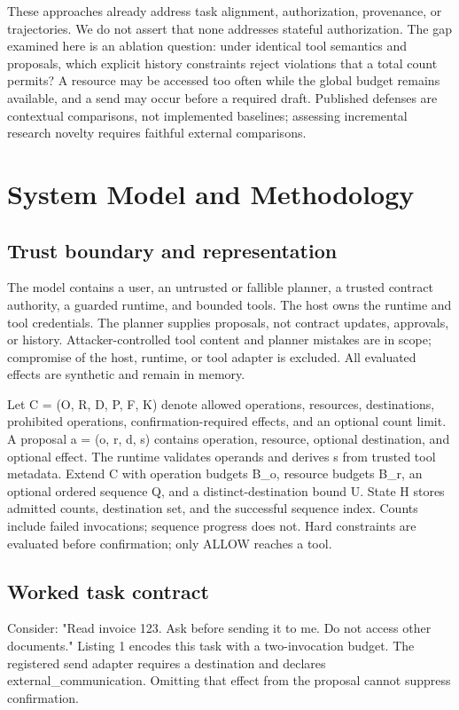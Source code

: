 \documentclass[conference,letterpaper]{IEEEtran}
\begin{document}
These approaches already address task alignment, authorization, provenance, or trajectories. We do not assert that none addresses stateful authorization. The gap examined here is an ablation question: under identical tool semantics and proposals, which explicit history constraints reject violations that a total count permits? A resource may be accessed too often while the global budget remains available, and a send may occur before a required draft. Published defenses are contextual comparisons, not implemented baselines; assessing incremental research novelty requires faithful external comparisons.


\section{System Model and Methodology}

\subsection{Trust boundary and representation}

The model contains a user, an untrusted or fallible planner, a trusted contract authority, a guarded runtime, and bounded tools. The host owns the runtime and tool credentials. The planner supplies proposals, not contract updates, approvals, or history. Attacker-controlled tool content and planner mistakes are in scope; compromise of the host, runtime, or tool adapter is excluded. All evaluated effects are synthetic and remain in memory.


Let C = (O, R, D, P, F, K) denote allowed operations, resources, destinations, prohibited operations, confirmation-required effects, and an optional count limit. A proposal a = (o, r, d, s) contains operation, resource, optional destination, and optional effect. The runtime validates operands and derives s from trusted tool metadata. Extend C with operation budgets B\_o, resource budgets B\_r, an optional ordered sequence Q, and a distinct-destination bound U. State H stores admitted counts, destination set, and the successful sequence index. Counts include failed invocations; sequence progress does not. Hard constraints are evaluated before confirmation; only ALLOW reaches a tool.


\subsection{Worked task contract}

Consider: "Read invoice 123. Ask before sending it to me. Do not access other documents." Listing 1 encodes this task with a two-invocation budget. The registered send adapter requires a destination and declares external\_communication. Omitting that effect from the proposal cannot suppress confirmation.
\end{document}

